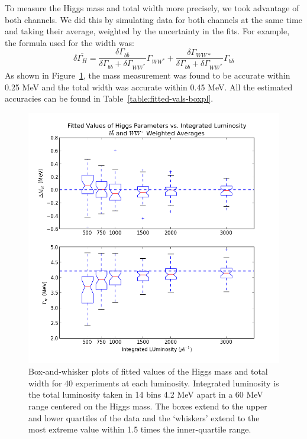 \documentclass[a4paper]{article}
\begin{document}
To measure the Higgs mass and total width more precisely, we took advantage of both channels. We did this by simulating data for both channels at the same time and taking their average, weighted by the uncertainty in the fits. For example, the formula used for the width was:
\begin{equation}
	\delta \overline{\Gamma_H} = \frac{\delta \Gamma_{b\bar{b}}}{\delta \Gamma_{b\bar{b}} + \delta \Gamma_{WW^*}}\Gamma_{WW^*} + \frac{\delta \Gamma_{WW*}}{\delta \Gamma_{b\bar{b}} + \delta \Gamma_{WW^*}}\Gamma_{b\bar{b}}\label{eq:weight-avg}
\end{equation}
As shown in Figure~\ref{fig:fitted-vals-boxpl-mix}, the mass measurement was found to be accurate within 0.25 MeV and the total width was accurate within 0.45 MeV. All the estimated accuracies can be found in Table~\ref{table:fitted-vals-boxpl}.

\begin{figure}
	\includegraphics[width=\textwidth]{fitted-vals-boxpl-mix}
	\caption{Box-and-whisker plots of fitted values of the Higgs mass and total width for 40 experiments at each luminosity. Integrated luminosity is the total luminosity taken in 14 bins 4.2 MeV apart in a 60 MeV range centered on the Higgs mass. The boxes extend to the upper and lower quartiles of the data and the `whiskers' extend to the most extreme value within 1.5 times the inner-quartile range.\label{fig:fitted-vals-boxpl-mix}}
\end{figure}
\end{document}
